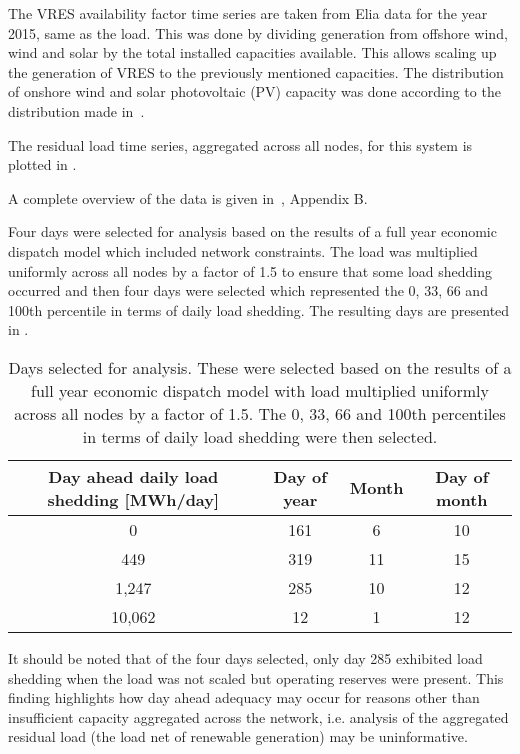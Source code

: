 \documentclass[number,times]{elsarticle}
\begin{document}
The \ac{VRES} availability factor time series are taken from Elia data for the year 2015, same as the load. This was done by dividing generation from offshore wind, wind and solar by the total installed capacities available. This allows scaling up the generation of \ac{VRES} to the previously mentioned capacities. The distribution of onshore wind and solar photovoltaic (PV) capacity was done according to the distribution made in~\cite{DelarueErik2016Dtio}.

The residual load time series, aggregated across all nodes, for this system is plotted in .

A complete overview of the data is given in~\cite{Belderbos2020}, Appendix B.

Four days were selected for analysis based on the results of a full year economic dispatch model which included network constraints. The load was multiplied uniformly across all nodes by a factor of 1.5 to ensure that some load shedding occurred and then four days were selected which represented the 0, 33, 66 and 100th percentile in terms of daily load shedding. The resulting days are presented in .

\begin{table}[ht]
    \centering
    \begin{tabular}{cccc}
        \toprule
        Day ahead daily load shedding [MWh/day] & Day of year & Month & Day of month \\
        \midrule
        0                                       & 161         & 6     & 10           \\
        449                                     & 319         & 11    & 15           \\
        1,247                                   & 285         & 10    & 12           \\
        10,062                                  & 12          & 1     & 12           \\
        \bottomrule
    \end{tabular}
    \caption{Days selected for analysis. These were selected based on the results of a full year economic dispatch model with load multiplied uniformly across all nodes by a factor of 1.5. The 0, 33, 66 and 100th percentiles in terms of daily load shedding were then selected.}\label{tab:day_selection}
\end{table}

It should be noted that of the four days selected, only day 285 exhibited load shedding when the load was not scaled but operating reserves were present. This finding highlights how day ahead adequacy may occur for reasons other than insufficient capacity aggregated across the network, i.e. analysis of the aggregated residual load (the load net of renewable generation) may be uninformative.
\end{document}
